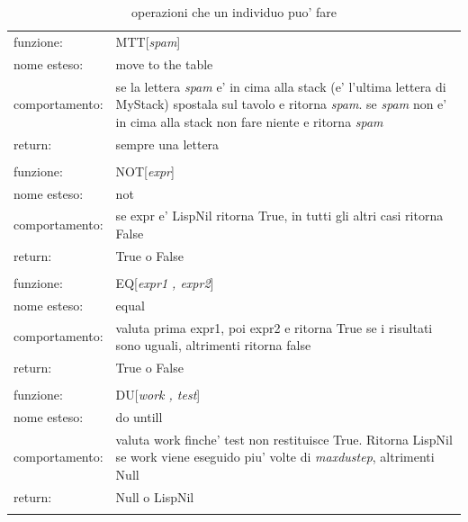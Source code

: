 \documentclass[12pt, a4paper]{article}
\begin{document}
\begin{longtable}{|l|p{10.0cm}|}
\hline
funzione:		& 	MTT[{\itshape spam}]\\
nome esteso:	& 	move to the table\\
comportamento:	& 	se la lettera {\itshape spam} e' in cima alla stack (e' l'ultima lettera di MyStack) spostala sul tavolo e ritorna {\itshape spam}. se {\itshape spam} non e' in cima alla stack non fare niente e ritorna {\itshape spam} \\
return:			& 	sempre una lettera\\
\hline
\multicolumn{2}{|c|}{}\\

\hline
funzione:		& 	NOT[{\itshape expr}]\\
nome esteso:	& 	not\\
comportamento:	& 	se expr e' LispNil ritorna True, in tutti gli altri casi ritorna False\\
return:			& 	True o False\\
\hline
\multicolumn{2}{|c|}{}\\

\hline
funzione:		& 	EQ[{\itshape expr1 , expr2}]\\
nome esteso:	& 	equal\\
comportamento:	& 	valuta prima expr1, poi expr2 e ritorna True se i risultati sono uguali, altrimenti ritorna false\\
return:			& 	True o False\\
\hline
\multicolumn{2}{|c|}{}\\

\hline
funzione:		& 	DU[{\itshape work , test}]\\
nome esteso:	& 	do untill\\
comportamento:	& 	valuta work finche' test non restituisce True. Ritorna LispNil se work viene eseguido piu' volte di {\itshape maxdustep}, altrimenti Null\\
return:			& 	Null o LispNil\\
\hline
\caption{operazioni che un individuo puo' fare}
\label{table:basicfun}
\end{longtable}

\lstset{caption=implementazione delle funzioni di base,
		label=source:basfun}

\end{document}
